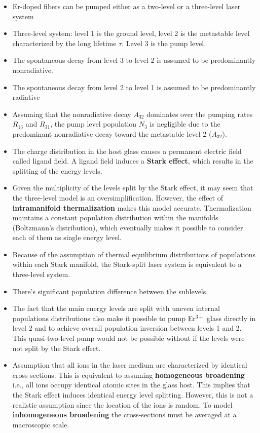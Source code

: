 \documentclass[a4paper]{article}
\begin{document}
\begin{itemize}
	\item Er-doped fibers can be pumped either as a two-level or a three-level  laser system
	\item Three-level system: level 1 is the ground level, level 2 is the metastable level characterized by the long lifetime $\tau$. Level 3 is the pump level.
	\item The spontaneous decay from level 3 to level 2 is assumed to be predominantly nonradiative.
	\item The spontaneous decay from level 2 to level 1 is assumed to be predominantly radiative
	\item Assuming that the nonradiative decay $A_{32}$ dominates over the pumping rates $R_{13}$ and $R_{31}$, the pump level population $N_3$ is negligible due to the predominant nonradiative decay toward the metastable level 2 ($A_{32}$).
	\item The charge distribution in the host glass causes a permanent electric field called ligand field. A ligand field induces a \textbf{Stark effect}, which results in the splitting of the energy levels.
	\item Given the multiplicity of the levels split by the Stark effect, it may seem that the three-level model is an oversimplification. However, the effect of \textbf{intramanifold thermalization} makes this model accurate. Thermalization maintains a constant population distribution within the manifolds (Boltzmann's distribution), which eventually makes it possible to consider each of them as single energy level.
	\item Because of the assumption of thermal equilibrium distributions of populations within each Stark manifold, the Stark-split laser system is equivalent to a three-level system.
	\item There's significant population difference between the sublevels.
	\item The fact that the main energy levels are split with uneven internal populations distributions also make it possible to pump Er$^{3+}$ glass directly in level 2 and to achieve overall population inversion between levels 1 and 2. This quasi-two-level pump would not be possible without if the levels were not split by the Stark effect.
	\item Assumption that all ions in the laser medium are characterized by identical cross-sections. This is equivalent to assuming \textbf{homogeneous broadening} i.e., all ions occupy identical atomic sites in the glass host. This implies that the Stark effect induces identical energy level splitting. However, this is not a realistic assumption since the location of the ions is random. To model \textbf{inhomogeneous broadening} the cross-sections must be averaged at a macroscopic scale. 

\end{itemize}
\end{document}
